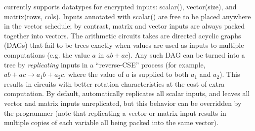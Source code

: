 \system currently supports datatypes for encrypted inputs: {\sf scalar()}, {\sf vector(size)}, and {\sf matrix(rows, cols)}.
Inputs annotated with {\sf scalar()} are free to be placed anywhere in the vector schedule; by contrast, {\sf matrix} and {\sf vector} inputs are always packed together into vectors. %
The arithmetic circuits \system takes are directed acyclic graphs (DAGs) that fail to be trees exactly when values are used as inputs to multiple computations (e.g. the value $a$ in $ab + ac$).
Any such DAG can  be turned into a tree by {\em replicating} inputs in a ``reverse-CSE'' process (for example, $ab + ac \to a_1b + a_2c$, where the value of $a$ is supplied to both $a_1$ and $a_2$).
This results in circuits with better rotation characteristics at the cost of extra computation.
By default, \system automatically replicates all {\sf scalar} inputs, and leaves all {\sf vector} and {\sf matrix} inputs unreplicated, but this behavior can be overridden by the programmer (note that replicating a {\sf vector} or {\sf matrix} input results in multiple copies of each variable all being packed into the same vector). %

